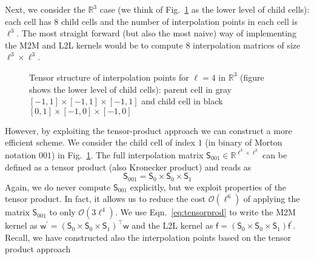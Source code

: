 \documentclass[]{article}
\newcommand{\Mat}[1]{\mathsf{#1}}  %
\theoremstyle{plain}
\begin{document}
Next, we consider the $\mathbb{R}^3$ case (we think of Fig.~\ref{fig:2dm2m} as
the lower level of child cells): each cell has $8$ child cells and the number
of interpolation points in each cell is $\ell^3$. The most straight forward
(but also the most naive) way of implementing the M2M and L2L kernels would be
to compute $8$ interpolation matrices of size $\ell^3\times\ell^3$.
\begin{figure}[htbp]
  \centering
  \caption{Tensor structure of interpolation points for $\ell=4$ in
    $\mathbb{R}^3$ (figure shows the lower level of child cells): parent cell
    in gray $[-1,1] \times [-1,1] \times [-1,1]$ and child cell in black
    $[0,1] \times [-1,0] \times [-1,0]$}
  \label{fig:2dm2m}
\end{figure}
However, by exploiting the tensor-product approach we can construct a more
efficient scheme. We consider the child cell of index $1$ (in binary of Morton
notation $001$) in Fig.~\ref{fig:2dm2m}. The full interpolation matrix
$\Mat{S}_{001}\in\mathbb{R}^{\ell^3\times\ell^3}$ can be defined as a tensor
product (also Kronecker product) and reads as
\begin{equation}
  \label{eq:tensorprod}
  \Mat{S}_{001} = \Mat{S}_0 \times \Mat{S}_0 \times \Mat{S}_1
\end{equation}
Again, we do never compute $\Mat{S}_{001}$ explicitly, but we exploit
properties of the tensor product. In fact, it allows us to reduce the cost
$\mathcal{O}(\ell^6)$ of applying the matrix $\Mat{S}_{001}$ to only
$\mathcal{O}(3\ell^4)$. We use Eqn.~\eqref{eq:tensorprod} to write the M2M
kernel as $\Mat{w}^\prime = \left( \Mat{S}_0 \times \Mat{S}_0 \times \Mat{S}_1
\right)^\top \Mat{w}$ and the L2L kernel as $\Mat{f} = \left( \Mat{S}_0 \times
  \Mat{S}_0 \times \Mat{S}_1 \right) \Mat{f}^\prime$. Recall, we have
constructed also the interpolation points based on the tensor product approach
\end{document}

